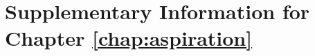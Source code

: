 \chapter{Supplementary Information for Chapter \ref{chap:aspiration}}\label{app:aspiration}

\graphicspath{{aspiration/figures/}}


